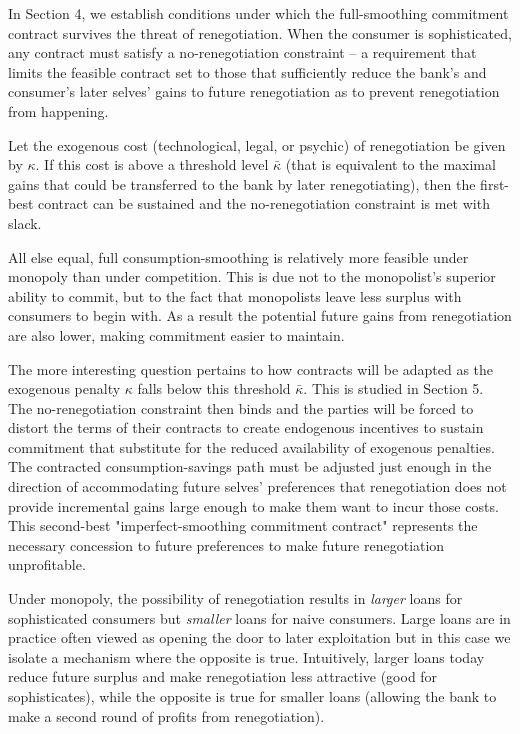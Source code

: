 \documentclass[11pt,english]{article}
\theoremstyle{plain}
\theoremstyle{definition}
\begin{document}
In Section 4, we establish conditions under which the full-smoothing commitment contract survives the threat of renegotiation. When the consumer is sophisticated, any contract must satisfy a no-renegotiation constraint -- a requirement that limits the feasible contract set to those that sufficiently reduce the bank's and consumer's later selves' gains to future renegotiation as to prevent renegotiation from happening. 

Let the exogenous cost (technological, legal, or psychic) of renegotiation be given by $\kappa$. If this cost is above a threshold level $\bar{\kappa}$ (that is equivalent to the maximal gains that could be transferred to the bank by later renegotiating), then the first-best contract can be sustained and the no-renegotiation constraint is met with slack. 

All else equal, full consumption-smoothing is relatively more feasible under monopoly than under competition. This is due not to the monopolist's superior ability to commit, but to the fact that monopolists leave less surplus with consumers to begin with. As a result the potential future gains from renegotiation are also lower, making commitment easier to maintain.

The more interesting question pertains to how contracts will be adapted as the exogenous penalty $\kappa$ falls below this threshold $\bar{\kappa}$. This is studied in Section 5. The no-renegotiation constraint then binds and the parties will be forced to distort the terms of their contracts to create endogenous incentives to sustain commitment that substitute for the reduced availability of exogenous penalties. The contracted consumption-savings path must be adjusted just enough in the direction of accommodating future selves' preferences that renegotiation does not provide incremental gains large enough to make them want to incur those costs. This second-best "imperfect-smoothing commitment contract" represents the necessary concession to future preferences to make future renegotiation unprofitable.

Under monopoly, the possibility of renegotiation results in \emph{larger} loans for sophisticated consumers but \emph{smaller} loans for naive consumers. Large loans are in practice often viewed as opening the door to later exploitation but in this case we isolate a
mechanism where the opposite is true. Intuitively, larger loans today reduce future surplus and make renegotiation less attractive (good for sophisticates), while the opposite is true for smaller loans (allowing the bank to make a second round of profits from renegotiation). 
\end{document}
